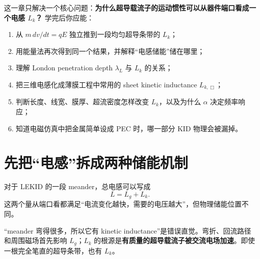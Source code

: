 \documentclass[11pt,a4paper,openany]{ctexrep}
\begin{document}
\begin{goalbox}
这一章只解决一个核心问题：\textbf{为什么超导载流子的运动惯性可以从器件端口看成一个电感 $L_k$？}
学完后你应能：
\begin{enumerate}
  \item 从 $m\,dv/dt=qE$ 独立推到一段均匀超导条带的 $L_k$；
  \item 用能量法再次得到同一个结果，并解释“电感储能”储在哪里；
  \item 理解 London penetration depth $\lambda_L$ 与 $L_k$ 的关系；
  \item 把三维电感化成薄膜工程中常用的 sheet kinetic inductance $L_{k,\Box}$；
  \item 判断长度、线宽、膜厚、超流密度怎样改变 $L_k$，以及为什么 $\alpha$ 决定频率响应；
  \item 知道电磁仿真中把金属简单设成 PEC 时，哪一部分 KID 物理会被漏掉。
\end{enumerate}
\end{goalbox}

\section{先把“电感”拆成两种储能机制}
对于 LEKID 的一段 meander，总电感可以写成
\[
L=L_g+L_k.
\]
这两个量从端口看都满足“电流变化越快，需要的电压越大”，但物理储能位置不同。

\begin{center}
\end{center}

\begin{intuitionbox}
“meander 弯得很多，所以它有 kinetic inductance”是错误直觉。弯折、回流路径和周围磁场首先影响 $L_g$；$L_k$ 的根源是\textbf{有质量的超导载流子被交流电场加速}。即使一根完全笔直的超导条带，也有 $L_k$。
\end{intuitionbox}
\end{document}
